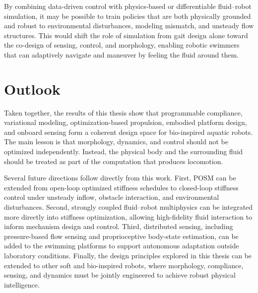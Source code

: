 By combining data-driven control with physics-based or differentiable fluid--robot simulation, it may be possible to train policies that are both physically grounded and robust to environmental disturbances, modeling mismatch, and unsteady flow structures. This would shift the role of simulation from gait design alone toward the co-design of sensing, control, and morphology, enabling robotic swimmers that can adaptively navigate and maneuver by feeling the fluid around them.

\section{Outlook}

Taken together, the results of this thesis show that programmable compliance, variational modeling, optimization-based propulsion, embodied platform design, and onboard sensing form a coherent design space for bio-inspired aquatic robots. The main lesson is that morphology, dynamics, and control should not be optimized independently. Instead, the physical body and the surrounding fluid should be treated as part of the computation that produces locomotion.

Several future directions follow directly from this work. First, POSM can be extended from open-loop optimized stiffness schedules to closed-loop stiffness control under unsteady inflow, obstacle interaction, and environmental disturbances. Second, strongly coupled fluid--robot multiphysics can be integrated more directly into stiffness optimization, allowing high-fidelity fluid interaction to inform mechanism design and control. Third, distributed sensing, including pressure-based flow sensing and proprioceptive body-state estimation, can be added to the swimming platforms to support autonomous adaptation outside laboratory conditions. Finally, the design principles explored in this thesis can be extended to other soft and bio-inspired robots, where morphology, compliance, sensing, and dynamics must be jointly engineered to achieve robust physical intelligence.
